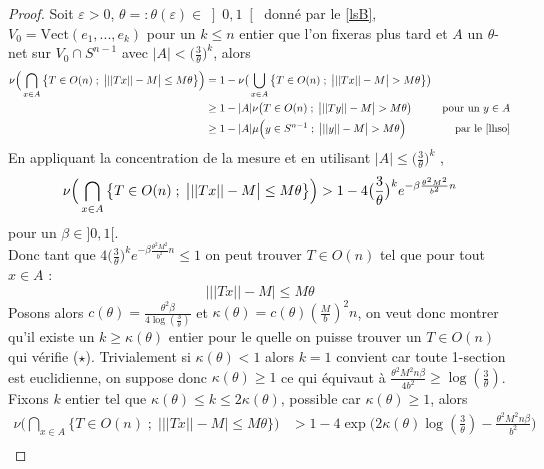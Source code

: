 \documentclass[12pt]{article}
\theoremstyle{definition}
\begin{document}
\begin{proof}
	Soit $\varepsilon>0$, $\theta=:\theta(\varepsilon)\in\left]0,1\right[$ donné par le \cref{lsB}, $V_0 = \text{Vect}(e_1,...,e_k)$ pour un $k\leq n$ entier que l'on fixeras plus tard et $A$ un $\theta$-net sur $V_0\cap S^{n-1}$ avec $|A|< \big(\frac{3}{\theta}\big)^k$, alors 
	\begin{align*}
	\nu\Big(\bigcap_{x\in A}\big\{T\in O(n)\; ; \;  \big| ||Tx||-M \big|\leq M\theta\big\}\Big)& = 1-\nu\big(\bigcup_{x\in A}\big\{T\in O(n)\; ; \; \big| ||Tx||-M \big|>M\theta\big\}\big)& \\
	& \geq 1-|A|\nu\big(T\in O(n)\; ; \; \big| ||Ty||-M \big|>M\theta\big)& \text{pour un $y\in A$}\\
	& \geq 1 - |A|\mu\Big(y\in S^{n-1}\; ;\; \big| ||y||-M \big|>M\theta\Big) & \text{par le \cref{lhso}}
	\end{align*} 
	En appliquant la concentration de la mesure et en utilisant $|A|\leq \big(\frac{3}{\theta}\big)^k$ ,
	\begin{equation*}
	\nu\Big(\bigcap_{x\in A}\big\{T\in O(n)\; ; \;  \big| ||Tx||-M \big|\leq M\theta\big\}\Big)> 1 - 4\big(\frac{3}{\theta}\big)^k e^{-\beta\frac{\theta^2M^2}{b^2}n}\\
	\end{equation*}
	pour un $\beta\in]0,1[$. \\
	Donc tant que $4\big(\frac{3}{\theta}\big)^k e^{-\beta\frac{\theta^2M^2}{b^2}n}\leq 1$ on peut trouver $T\in O(n)$ tel que pour tout $x\in A$ :
	\begin{equation*}\tag{$\star$}
	\Big| ||Tx||- M \Big|\leq M\theta
	\end{equation*}
	Posons alors $c(\theta)=\frac{\theta^2 \beta}{4\log\left(\frac{3}{\theta}\right)}$ et $\kappa(\theta)=c(\theta)\left(\frac{M}{b}\right)^2 n$, on veut donc montrer qu'il existe un $k\geq \kappa(\theta)$ entier pour le quelle on puisse trouver un $T\in O(n)$ qui vérifie ($\star$). Trivialement si $\kappa(\theta)<1$ alors $k=1$ convient car toute 1-section est euclidienne, on suppose donc $\kappa(\theta)\geq 1$ ce qui équivaut à $\frac{\theta^2M^2n\beta}{4b^2}\geq \log(\frac{3}{\theta})$. Fixons $k$ entier tel que $\kappa(\theta)\leq k\leq 2\kappa(\theta)$, possible car $\kappa(\theta)\geq 1$, alors
	\begin{align*}
	\nu\Big(\bigcap_{x\in A}\big\{T\in O(n)\; ; \;  \big| ||Tx||-M \big|\leq M\theta\big\}\Big)
	& > 1 - 4 \exp\big(2\kappa(\theta)\log(\frac{3}{\theta})-\frac{\theta^2M^2n\beta}{b^2}\big)\\

\end{align*}
\end{proof}
\end{document}
